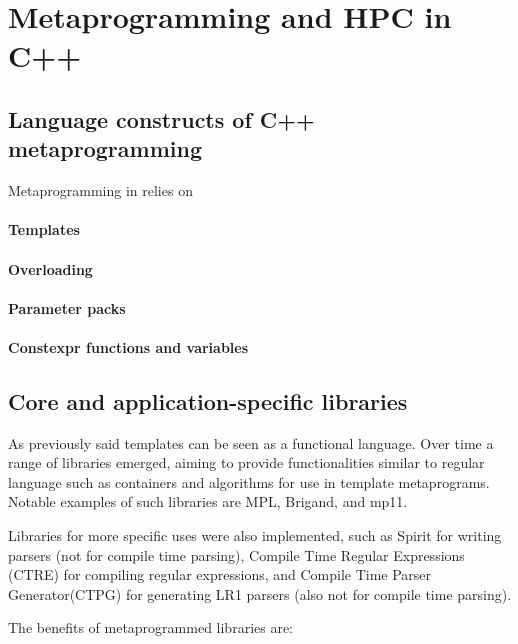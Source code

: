 \documentclass[../main]{subfiles}
\begin{document}
\section{Metaprogramming and HPC in C++} \label{lbl:meta-cpp}

\subsection{Language constructs of C++ metaprogramming}

Metaprogramming in \cpp relies on

\paragraph{Templates}

\paragraph{Overloading}

\paragraph{Parameter packs}

\paragraph{Constexpr functions and variables}

\subsection{Core and application-specific libraries}

As previously said \cpp templates can be seen as a functional language.
Over time a range of libraries emerged, aiming to provide functionalities
similar to regular language such as containers and algorithms for use in
template metaprograms. Notable examples of such libraries are MPL\cite{mpl},
Brigand\cite{brigand}, and mp11\cite{mp11}.

Libraries for more specific uses were also implemented, such as
Spirit\cite{spirit} for writing parsers (not for compile time parsing),
Compile Time Regular Expressions (CTRE)\cite{ctre}
for compiling regular expressions,
and Compile Time Parser Generator(CTPG)\cite{ctpg}
for generating LR1 parsers (also not for compile time parsing).

The benefits of metaprogrammed libraries are:
\end{document}
